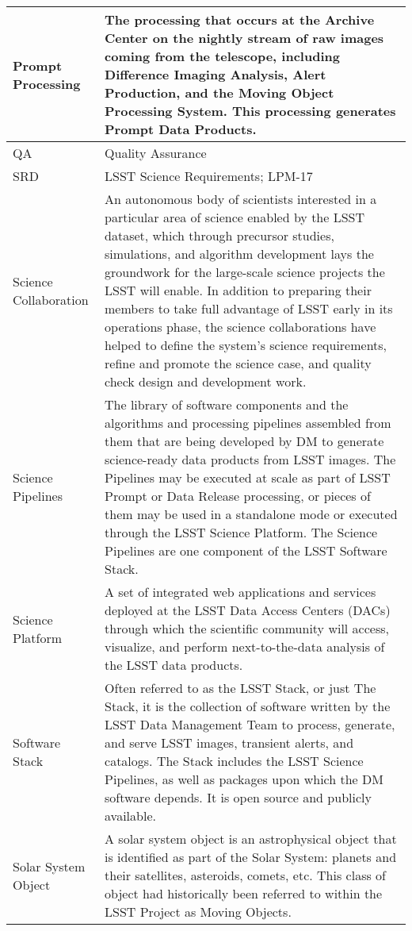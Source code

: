 \begin{longtable}{|l|p{}|}
Prompt Processing & The processing that occurs at the \gls{Archive} \gls{Center} on the nightly stream of raw images coming from the telescope, including Difference Imaging Analysis, \gls{Alert} Production, and the \gls{Moving Object Processing System}. This processing generates Prompt Data Products. \\\hline
QA & Quality Assurance \\\hline
SRD & \gls{LSST} Science Requirements; LPM-17 \\\hline
Science Collaboration & An autonomous body of scientists interested in a particular area of science enabled by the \gls{LSST} dataset, which through precursor studies, simulations, and \gls{algorithm} development lays the groundwork for the large-scale science projects the \gls{LSST} will enable.  In addition to preparing their members to take full advantage of \gls{LSST} early in its operations phase, the science collaborations have helped to define the system's science requirements, refine and promote the science case, and quality check design and development work. \\\hline
Science Pipelines & The library of software components and the algorithms and processing pipelines assembled from them that are being developed by \gls{DM} to generate science-ready data products from \gls{LSST} images. The Pipelines may be executed at scale as part of \gls{LSST} Prompt or \gls{Data Release} processing, or pieces of them may be used in a standalone mode or executed through the \gls{LSST} \gls{Science Platform}. The \gls{Science Pipelines} are one component of the \gls{LSST} \gls{Software Stack}. \\\hline
Science Platform & A set of integrated web applications and services deployed at the \gls{LSST} Data Access Centers (DACs) through which the scientific community will access, visualize, and perform next-to-the-data analysis of the \gls{LSST} data products. \\\hline
Software Stack & Often referred to as the \gls{LSST} Stack, or just The Stack, it is the collection of software written by the \gls{LSST} \gls{Data Management} Team to process, generate, and serve \gls{LSST} images, \gls{transient} alerts, and catalogs. The Stack includes the \gls{LSST} \gls{Science Pipelines}, as well as packages upon which the \gls{DM} software depends. It is open source and publicly available. \\\hline
Solar System \gls{Object} & A solar system object is an astrophysical object that is identified as part of the Solar System: planets and their satellites, asteroids, comets, etc. This class of object had historically been referred to within the \gls{LSST} Project as Moving Objects. \\\hline

\end{longtable}
